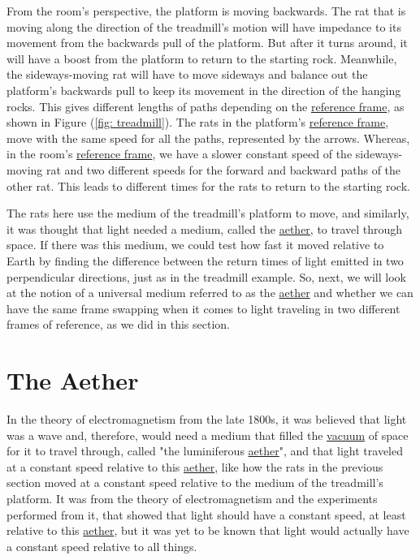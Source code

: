 From the room's perspective, the platform is moving backwards.
The rat that is moving along the direction of the treadmill's motion will have impedance to its movement from the backwards pull of the platform.
But after it turns around, it will have a boost from the platform to return to the starting rock.
Meanwhile, the sideways-moving rat will have to move sideways and balance out the platform's backwards pull to keep its movement in the direction of the hanging rocks.
This gives different lengths of paths depending on the \hyperlink{def-Reference-frame}{reference frame}, as shown in Figure (\ref{fig: treadmill}).
The rats in the platform's \hyperlink{def-Reference-frame}{reference frame}, move with the same speed for all the paths, represented by the arrows.
Whereas, in the room's \hyperlink{def-Reference-frame}{reference frame}, we have a slower constant speed of the sideways-moving rat and two different speeds for the forward and backward paths of the other rat.
This leads to different times for the rats to return to the starting rock.

The rats here use the medium of the treadmill's platform to move, and similarly, it was thought that light needed a medium, called the \hyperlink{def-aether}{aether}, to travel through space.
If there was this medium, we could test how fast it moved relative to Earth by finding the difference between the return times of light emitted in two perpendicular directions, just as in the treadmill example.
So, next, we will look at the notion of a universal medium referred to as the \hyperlink{def-aether}{aether} and whether we can have the same frame swapping when it comes to light traveling in two different frames of reference, as we did in this section.

\section{The Aether} \label{sect: The Aether}

In the theory of electromagnetism from the late 1800s, it was believed that light was a wave and, therefore, would need a medium that filled the \hyperlink{def-vacuum}{vacuum} of space for it to travel through, called "the luminiferous \hyperlink{def-aether}{aether}", and that light traveled at a constant speed relative to this \hyperlink{def-aether}{aether}, like how the rats in the previous section moved at a constant speed relative to the medium of the treadmill's platform.
It was from the theory of electromagnetism and the experiments performed from it, that showed that light should have a constant speed, at least relative to this \hyperlink{def-aether}{aether}, but it was yet to be known that light would actually have a constant speed relative to all things.

